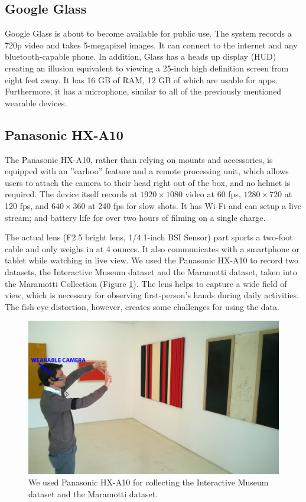 \subsection{Google Glass}
Google Glass is about to become available for public use. The system records a 720p video and
takes 5-megapixel images. It can connect to the internet and any bluetooth-capable phone. In
addition, Glass has a heads up display (HUD) creating an illusion equivalent to viewing a 25-inch
high definition screen from eight feet away. It has 16 GB of RAM, 12 GB of which are usable for
apps. Furthermore, it has a microphone, similar to all of the previously mentioned wearable devices.

\subsection{Panasonic HX-A10}
The Panasonic HX-A10, rather than relying on mounts and accessories, is equipped with an ''earhoo'' feature and a remote processing unit, which allows users to attach the camera to their head right out of the box, and no helmet is required. The device itself records at $1920\times1080$ video at 60 fps, $1280\times 720$ at 120 fps, and $640\times360$ at 240 fps for slow shots. It has Wi-Fi and can setup a live stream; and battery life for over two hours of filming on a single charge.

The actual lens (F2.5 bright lens, 1/4.1-inch BSI Sensor) part sports a two-foot cable and only weighs in at 4 ounces. It also communicates with a smartphone or tablet while watching in live view. We used the Panasonic HX-A10 to record two datasets, the Interactive Museum dataset and the Maramotti dataset, taken into the Maramotti Collection (Figure \ref{fig:Panasonic}). The lens helps to capture a wide field of view, which is necessary for observing first-person’s hands during daily activities. The fish-eye distortion, however, creates some challenges for using the data.


\begin{figure}[htbp]
	\centering
		\includegraphics[width=0.4\linewidth]{Figures/lore_maramotti.jpg}
	\caption{We used Panasonic HX-A10 for collecting the Interactive Museum dataset and the Maramotti dataset.}
	\label{fig:Panasonic}
\end{figure}

